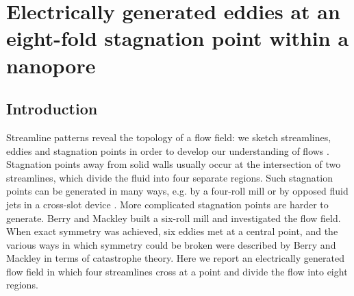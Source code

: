 \chapter{Electrically generated eddies at an eight-fold stagnation point
within a nanopore}\label{chpt:eddies}
\section{Introduction}
Streamline patterns reveal the topology of a flow field:
we sketch streamlines, eddies and stagnation points
in order to develop our understanding of flows
\cite{moffatt1964,jeffrey1980}.
Stagnation points away from solid walls usually occur at the intersection of
two streamlines, which divide the fluid into four separate regions.
Such stagnation points can be generated in many ways, e.g. by
a four-roll mill \cite{taylor1934} or by opposed fluid jets
in a cross-slot device \cite{scrivener1979,cachile2012}.
More complicated stagnation points are harder to generate.
Berry and Mackley \cite{berry1977} built  a six-roll mill and investigated
the flow field. When exact symmetry was achieved,
six eddies met at a central point, and the various ways in which
symmetry could be broken were described by Berry and Mackley
in terms of catastrophe theory. Here we report an electrically
generated flow
field in which four streamlines cross at a point and divide the flow into eight
regions.


